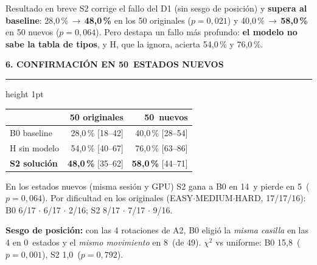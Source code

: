 \documentclass[10pt,a4paper]{extarticle}
\newcommand{\accBase}{28{,}0}
\newcommand{\accBaseH}{40{,}0}
\newcommand{\accHeur}{54{,}0}
\newcommand{\accHeurH}{76{,}0}
\newcommand{\accStwo}{48{,}0}
\newcommand{\accStwoH}{58{,}0}
\newcommand{\chiBase}{15{,}8}
\newcommand{\chiPBase}{0{,}001}
\newcommand{\chiPStwo}{0{,}792}
\newcommand{\chiStwo}{1{,}0}
\newcommand{\ciBase}{18--42}
\newcommand{\ciBaseH}{28--54}
\newcommand{\ciHeur}{40--67}
\newcommand{\ciHeurH}{63--86}
\newcommand{\ciStwo}{35--62}
\newcommand{\ciStwoH}{44--71}
\newcommand{\diffBase}{6/17 $\cdot$ 6/17 $\cdot$ 2/16}
\newcommand{\diffStwo}{8/17 $\cdot$ 7/17 $\cdot$ 9/16}
\newcommand{\holdN}{50}
\newcommand{\lossStwoH}{5}
\newcommand{\pStwo}{0{,}021}
\newcommand{\pStwoH}{0{,}064}
\newcommand{\permComplete}{49}
\newcommand{\posBase}{(MOVE\_1,14)(MOVE\_2,23)(MOVE\_3,9)(MOVE\_4,4)}
\newcommand{\posOpt}{(MOVE\_1,18)(MOVE\_2,8)(MOVE\_3,14)(MOVE\_4,10)}
\newcommand{\posStwo}{(MOVE\_1,13)(MOVE\_2,15)(MOVE\_3,10)(MOVE\_4,12)}
\newcommand{\sameMove}{8}
\newcommand{\sameSlot}{0}
\newcommand{\split}{17/17/16}
\newcommand{\winStwoH}{14}
\newcommand{\heading}[1]{%
  \par\vspace{1.2mm}\noindent
  {\color{navy}\bfseries\small\MakeUppercase{#1}}\par\vspace{0.5mm}
  {\color{amber}\hrule height 1pt}\vspace{0.9mm}\noindent\ignorespaces}
\begin{document}
\begin{minipage}[t]{0.488\linewidth}
\setlength{\parskip}{0.55mm}
\vspace{1.2mm}
\begin{keybox}{Resultado en breve}
\footnotesize S2 corrige el fallo del D1 (sin sesgo de posici\'on) y \textbf{supera al baseline}: \accBase\,\%\,$\to$\,\textbf{\accStwo\,\%} en los 50 originales ($p=\pStwo$) y \accBaseH\,\%\,$\to$\,\textbf{\accStwoH\,\%} en 50 nuevos ($p=\pStwoH$). Pero destapa un fallo m\'as profundo: \textbf{el modelo no sabe la tabla de tipos}, y H, que la ignora, acierta \accHeur\,\% y \accHeurH\,\%.
\end{keybox}
\heading{6. Confirmaci\'on en \holdN\ estados nuevos}
{\centering\footnotesize
\begin{tabular}{@{}lrr@{}}
\toprule
& \textbf{50 originales} & \textbf{\holdN\ nuevos}\\
\midrule
B0 baseline & \accBase\,\% [\ciBase] & \accBaseH\,\% [\ciBaseH]\\
H sin modelo & \accHeur\,\% [\ciHeur] & \accHeurH\,\% [\ciHeurH]\\
\textbf{S2 soluci\'on} & \textbf{\accStwo\,\%} [\ciStwo] & \textbf{\accStwoH\,\%} [\ciStwoH]\\
\bottomrule
\end{tabular}\par}
\vspace{0.2mm}
{\scriptsize En los estados nuevos (misma sesi\'on y GPU) S2 gana a B0 en \winStwoH\ y pierde en \lossStwoH\ ($p=\pStwoH$). Por dificultad en los originales (EASY$\cdot$MEDIUM$\cdot$HARD, \split): B0 \diffBase; S2 \diffStwo.}

\vspace{0.3mm}
{\centering
{}\par}
\vspace{-0.8mm}
{\scriptsize \textbf{Sesgo de posici\'on:} con las 4 rotaciones de A2, B0 eligi\'o la \emph{misma casilla} en las 4 en \sameSlot\ estados y el \emph{mismo movimiento} en \sameMove\ (de \permComplete). $\chi^2$ vs uniforme: B0 \chiBase\ ($p{=}\chiPBase$), S2 \chiStwo\ ($p{=}\chiPStwo$).}


\end{minipage}
\end{document}

